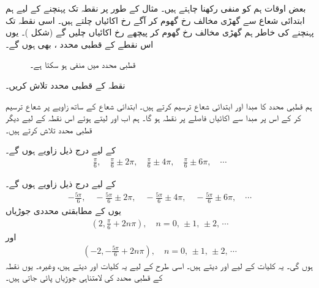 بعض اوقات ہم  کو منفی رکھنا چاہتے ہیں۔ مثال کے طور پر نقطہ  تک پہنچنے کے لیے ہم ابتدائی شعاع سے گھڑی مخالف رخ  گھوم کر آگے رخ  اکائیاں چلتے ہیں۔ اسی نقطہ تک پہنچنے کی خاطر ہم گھڑی مخالف رخ  گھوم کر پیچھے رخ  اکائیاں چلیں گے (شکل )۔ یوں اس نقطے کے قطبی محدد ،  بھی ہوں گے۔
\begin{figure}
\centering
\begin{minipage}{0.45\textwidth}
\centering
{}
\caption{قطبی محدد میں  منفی ہو سکتا ہے۔}
\label{شکل_مخروط_منفی_قطبی_رداس}
\end{minipage}
\end{figure}

نقطہ  کے قطبی محدد تلاش کریں۔

ہم قطبی محدد کا مبدا اور ابتدائی شعاع ترسیم کرتے ہیں۔ ابتدائی شعاع  کے ساتھ  زاویے پر شعاع ترسیم کر کے اس پر مبدا سے  اکائیاں فاصلے  پر نقطہ  ہو گا۔ ہم اب  اور  لیتے ہوئے اس نقطہ کے لیے  دیگر قطبی محدد تلاش کرتے ہیں۔

 کے لیے درج ذیل زاویے ہوں گے۔
\begin{align*}
\frac{\pi}{6},\quad \frac{\pi}{6}\pm 2\pi,\quad \frac{\pi}{6}\pm 4\pi,\quad \frac{\pi}{6}\pm 6\pi,\quad \cdots
\end{align*}

 کے لیے درج ذیل زاویے ہوں گے۔
\begin{align*}
-\frac{5\pi}{6},\quad -\frac{5\pi}{6}\pm 2\pi,\quad -\frac{5\pi}{6}\pm 4\pi,\quad -\frac{5\pi}{6}\pm 6\pi,\quad \cdots
\end{align*}
یوں  کے مطابقتی محددی جوڑیاں
\begin{align*}
(2,\tfrac{\pi}{6}+ 2n\pi),\quad n=0,\, \pm 1,\, \pm 2,\,\cdots
\end{align*}
اور
\begin{align*}
(-2,-\tfrac{5\pi}{6}+2n\pi),\quad n=0,\, \pm 1,\, \pm 2,\,\cdots
\end{align*}
ہوں گی۔ یہ کلیات  کے لیے  اور  دیتے ہیں۔ اسی طرح  کے لیے یہ کلیات   اور   دیتے ہیں، وغیرہ۔ یوں نقطہ  کے قطبی محدد کی  لامتناہی  جوڑیاں پائی جاتی ہیں۔

